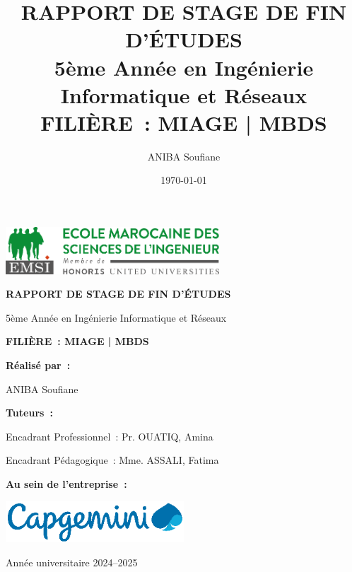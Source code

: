 \documentclass[12pt,a4paper,twoside,openright]{report}
\title{\textbf{RAPPORT DE STAGE DE FIN D'ÉTUDES} \\
       \large{5ème Année en Ingénierie Informatique et Réseaux} \\
       \vspace{0.5cm}
       \textbf{FILIÈRE~: MIAGE | MBDS}}
\author{ANIBA Soufiane}
\date{\today}
\begin{document}
\pagestyle{fancy}

\begin{titlepage}
    \centering

    \includegraphics[width=0.6\textwidth]{latex_media/media/image1.png}

    \vspace{1cm}

    {\huge\bfseries RAPPORT DE STAGE DE FIN D'ÉTUDES \par}

    \vspace{0.5cm}
    {\Large 5ème Année en Ingénierie Informatique et Réseaux \par}

    \vspace{0.5cm}
    {\Large\bfseries FILIÈRE~: MIAGE | MBDS \par}

    \vspace{2cm}

    {\Large\textbf{Réalisé par~:} \par}
    \vspace{0.3cm}
    {\Large ANIBA Soufiane \par}

    \vspace{2cm}

    {\Large\textbf{Tuteurs~:} \par}
    \vspace{0.3cm}
    {\large Encadrant Professionnel~: Pr. OUATIQ, Amina \par}
    \vspace{0.2cm}
    {\large Encadrant Pédagogique~: Mme. ASSALI, Fatima \par}

    \vspace{2cm}

    {\Large\textbf{Au sein de l'entreprise~:} \par}
    \vspace{0.5cm}
    \includegraphics[width=0.5\textwidth]{latex_media/media/image2.png}

    \vfill

    {\large Année universitaire 2024--2025 \par}
\end{titlepage}
\end{document}
